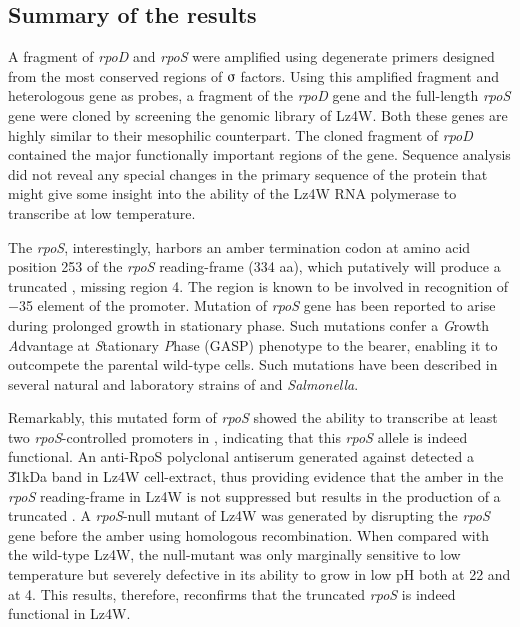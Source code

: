 \subsection*{Summary of the results}

A fragment of \emph{rpoD} and \emph{rpoS} were amplified using
degenerate primers designed from the most conserved regions of
$\sigmaup$ factors. Using this amplified fragment and heterologous
gene as probes, a fragment of the \emph{rpoD} gene and the
full-length \emph{rpoS} gene were cloned by screening the genomic
library of Lz4W\@. Both these genes are highly similar to their
mesophilic counterpart. The cloned fragment of \emph{rpoD}
contained the major functionally important regions of the gene.
Sequence analysis did not reveal any special changes in the
primary sequence of the protein that might give some insight into
the ability of the Lz4W RNA polymerase to transcribe at low
temperature.

The \emph{rpoS}, interestingly, harbors an amber termination codon
at amino acid position 253 of the \emph{rpoS} reading-frame (334
aa), which putatively will produce a truncated \sigs{}, missing
region 4. The region is known to be involved in recognition of
$-$35 element of the promoter. Mutation of \emph{rpoS} gene has
been reported to arise during prolonged growth in stationary
phase. Such mutations confer a \emph{G}rowth \emph{A}dvantage at
\emph{S}tationary \emph{P}hase (GASP) phenotype to the bearer,
enabling it to outcompete the parental wild-type cells. Such
mutations have been described in several natural and laboratory
strains of  and \emph{Salmonella}.

Remarkably, this mutated form of  \emph{rpoS} showed the
ability to transcribe at least two \emph{rpoS}-controlled
promoters in , indicating that this \emph{rpoS} allele is
indeed functional. An anti-RpoS polyclonal antiserum generated
against  \sigs{} detected a \U{31}{kDa} band in 
Lz4W cell-extract, thus providing evidence that the amber in the
\emph{rpoS} reading-frame in Lz4W is not suppressed but results in
the production of a truncated \sigs{}\@. A \emph{rpoS}-null mutant
of Lz4W was generated by disrupting the \emph{rpoS} gene before
the amber using homologous recombination. When compared with the
wild-type Lz4W, the null-mutant was only marginally sensitive to
low temperature but severely defective in its ability to grow in
low pH both at 22\dg{} and at 4\dg{}\@. This results, therefore,
reconfirms that the truncated \emph{rpoS} is indeed functional in
 Lz4W.


